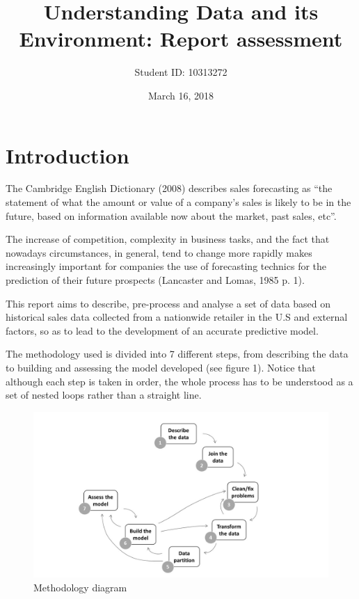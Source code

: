 \documentclass[11pt,]{article}
\title{Understanding Data and its Environment: Report assessment}
\author{Student ID: 10313272}
\date{March 16, 2018}
\begin{document}
\maketitle

{
\setcounter{tocdepth}{2}
\tableofcontents
}
\pagebreak

\section{Introduction}\label{introduction}

The Cambridge English Dictionary (2008) describes sales forecasting as
``the statement of what the amount or value of a company's sales is
likely to be in the future, based on information available now about the
market, past sales, etc''.

The increase of competition, complexity in business tasks, and the fact
that nowadays circumstances, in general, tend to change more rapidly
makes increasingly important for companies the use of forecasting
technics for the prediction of their future prospects (Lancaster and
Lomas, 1985 p. 1).

This report aims to describe, pre-process and analyse a set of data
based on historical sales data collected from a nationwide retailer in
the U.S and external factors, so as to lead to the development of an
accurate predictive model.

The methodology used is divided into 7 different steps, from describing
the data to building and assessing the model developed (see figure 1).
Notice that although each step is taken in order, the whole process has
to be understood as a set of nested loops rather than a straight line.

\begin{figure}[htbp]
\centering
\includegraphics{images/Methodology diagram.jpg}
\caption{Methodology diagram \label{}}
\end{figure}
\end{document}
